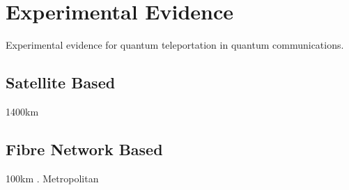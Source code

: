 \section{Experimental Evidence}
Experimental evidence for quantum teleportation in quantum communications.
\subsection{Satellite Based}
1400km \cite{Ren:2017}

\subsection{Fibre Network Based}
100km \cite{Takesue:2015}. Metropolitan \cite{Valivarthi:2016} 